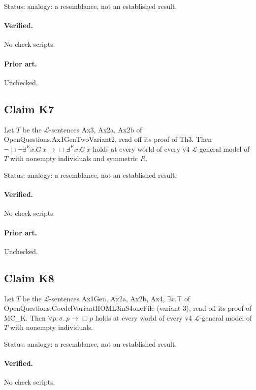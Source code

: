 \documentclass{article}
\begin{document}
Status: analogy: a resemblance, not an established result.

\paragraph{Verified.}
No check scripts.

\paragraph{Prior art.} Unchecked.

\subsection*{Claim K7}

Let $T$ be the $\mathcal L$-sentences Ax3, Ax2a, Ax2b of OpenQuestions.Ax1GenTwoVariant2, read off its proof of Th3. Then $\neg\Box\neg\exists^E x.G\,x\to\Box\exists^E x.G\,x$ holds at every world of every v4 $\mathcal L$-general model of $T$ with nonempty individuals and symmetric $R$.

Status: analogy: a resemblance, not an established result.

\paragraph{Verified.}
No check scripts.

\paragraph{Prior art.} Unchecked.

\subsection*{Claim K8}

Let $T$ be the $\mathcal L$-sentences Ax1Gen, Ax2a, Ax2b, Ax4, $\exists x.\top$ of OpenQuestions.GoedelVariantHOML3inS4oneFile (variant 3), read off its proof of MC\_K. Then $\forall p{:}\sigma.\,p\to\Box p$ holds at every world of every v4 $\mathcal L$-general model of $T$ with nonempty individuals.

Status: analogy: a resemblance, not an established result.

\paragraph{Verified.}
No check scripts.
\end{document}
